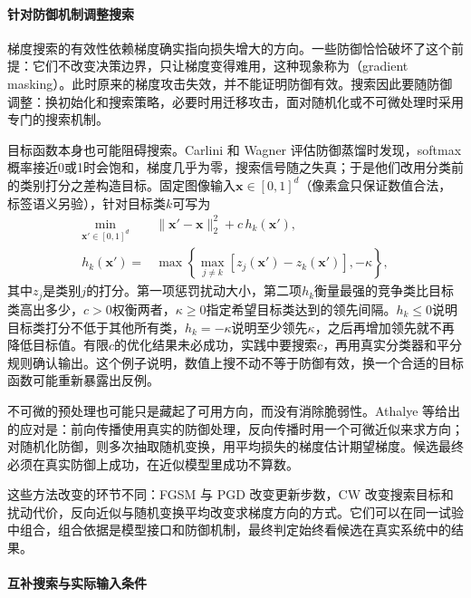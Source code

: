 \paragraph{针对防御机制调整搜索}

梯度搜索的有效性依赖梯度确实指向损失增大的方向。一些防御恰恰破坏了这个前提：它们不改变决策边界，只让梯度变得难用，这种现象称为（gradient masking）。此时原来的梯度攻击失效，并不能证明防御有效。搜索因此要随防御调整：换初始化和搜索策略，必要时用迁移攻击，面对随机化或不可微处理时采用专门的搜索机制。

目标函数本身也可能阻碍搜索。Carlini 和 Wagner 评估防御蒸馏时发现，softmax 概率接近0或1时会饱和，梯度几乎为零，搜索信号随之失真；于是他们改用分类前的类别打分之差构造目标。固定图像输入$\bm x\in[0,1]^d$（像素盒只保证数值合法，标签语义另验），针对目标类$k$可写为
\begin{equation}
 \begin{aligned}
 \min_{\bm{x}'\in[0,1]^d}\quad&
 \|\bm{x}'-\bm{x}\|_2^2+c\,h_k(\bm{x}'),\\
 h_k(\bm{x}')={}&
 \max\left\{\max_{j\ne k}
 [z_j(\bm{x}')-z_k(\bm{x}')],-\kappa\right\},
 \end{aligned}
 \label{eq:security-cw}
\end{equation}
其中$z_j$是类别$j$的打分。第一项惩罚扰动大小，第二项$h_k$衡量最强的竞争类比目标类高出多少，$c>0$权衡两者，$\kappa\geq0$指定希望目标类达到的领先间隔。$h_k\leq0$说明目标类打分不低于其他所有类，$h_k=-\kappa$说明至少领先$\kappa$，之后再增加领先就不再降低目标值。有限$c$的优化结果未必成功，实践中要搜索$c$，再用真实分类器和平分规则确认输出。这个例子说明，数值上搜不动不等于防御有效，换一个合适的目标函数可能重新暴露出反例。

不可微的预处理也可能只是藏起了可用方向，而没有消除脆弱性。Athalye 等给出的应对是：前向传播使用真实的防御处理，反向传播时用一个可微近似来求方向；对随机化防御，则多次抽取随机变换，用平均损失的梯度估计期望梯度。候选最终必须在真实防御上成功，在近似模型里成功不算数。

这些方法改变的环节不同：FGSM 与 PGD 改变更新步数，CW 改变搜索目标和扰动代价，反向近似与随机变换平均改变求梯度方向的方式。它们可以在同一试验中组合，组合依据是模型接口和防御机制，最终判定始终看候选在真实系统中的结果。

\paragraph{互补搜索与实际输入条件}

